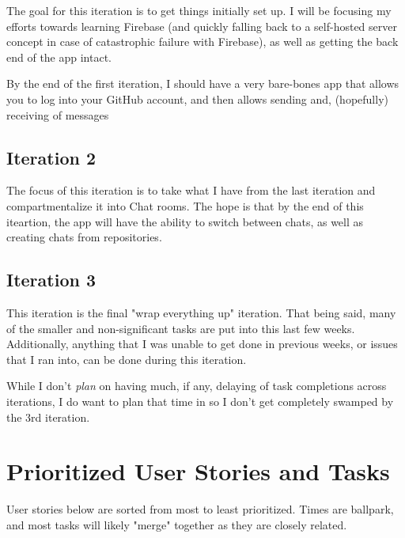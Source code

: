 \documentclass{report}
\begin{document}
The goal for this iteration is to get things initially set up. I will be focusing my efforts towards learning Firebase (and quickly falling back to a self-hosted server concept in case of catastrophic failure with Firebase), as well as getting the back end of the app intact.

By the end of the first iteration, I should have a very bare-bones app that allows you to log into your GitHub account, and then allows sending and, (hopefully) receiving  of messages

\subsection{Iteration 2}

The focus of this iteration is to take what I have from the last iteration and compartmentalize it into Chat rooms. The hope is that by the end of this iteartion, the app will have the ability to switch between chats, as well as creating chats from repositories.

\subsection{Iteration 3}

This iteration is the final "wrap everything up" iteration. That being said, many of the smaller and non-significant tasks are put into this last few weeks. Additionally, anything that I was unable to get done in previous weeks, or issues that I ran into, can be done during this iteration.

While I don't \textit{plan} on having much, if any, delaying of task completions across iterations, I do want to plan that time in so I don't get completely swamped by the 3rd iteration.

\section{Prioritized User Stories and Tasks}

User stories below are sorted from most to least prioritized. Times are ballpark, and most tasks will likely "merge" together as they are closely related.
\end{document}

